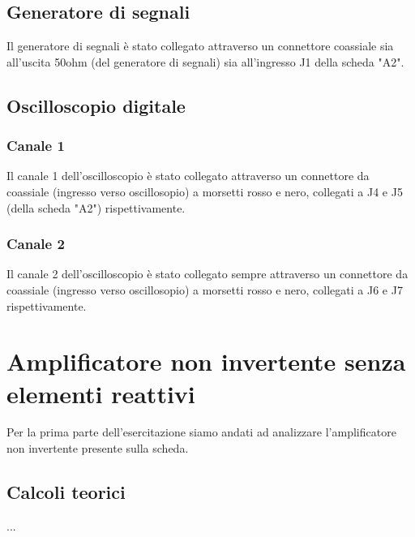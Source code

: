 \documentclass{article}
\begin{document}
\subsection{Generatore di segnali}
Il generatore di segnali è stato collegato attraverso un connettore coassiale sia all'uscita 50ohm (del generatore di segnali) sia all'ingresso J1 della scheda "A2".

\subsection{Oscilloscopio digitale}
\subsubsection{Canale 1} Il canale 1 dell'oscilloscopio è stato collegato attraverso un connettore da coassiale (ingresso verso oscillosopio) a morsetti rosso e nero, collegati a J4 e J5 (della scheda "A2") rispettivamente.
\subsubsection{Canale 2} Il canale 2 dell'oscilloscopio è stato collegato sempre attraverso un connettore da coassiale (ingresso verso oscillosopio) a morsetti rosso e nero, collegati a J6 e J7 rispettivamente.

\section{Amplificatore non invertente senza elementi reattivi}
Per la prima parte dell'esercitazione siamo andati ad analizzare l'amplificatore non invertente presente sulla scheda.
\subsection{Calcoli teorici}
...
\end{document}

